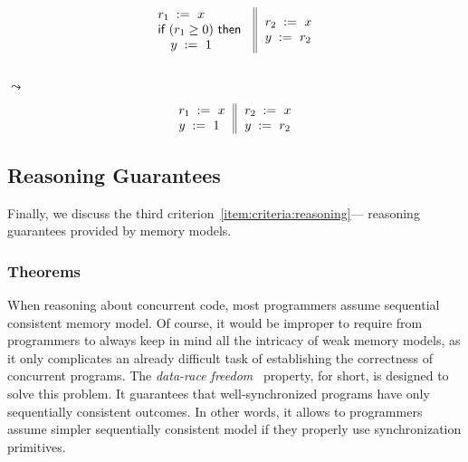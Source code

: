 {\footnotesize
\begin{minipage}{0.45\linewidth}
\begin{equation*}
\inarrII{
   \readInst{}{r_1}{x}             \\
   \kw{if} (r_1 \geq 0) ~\kw{then} \\
   \quad\writeInst{}{y}{1}         \\
}{
  \readInst{}{r_2}{x}               \\
  \writeInst{}{y}{r_2}              \\
}
\end{equation*}
\end{minipage}\hfill%
\begin{minipage}{0.05\linewidth}
\Large~\\ $\leadsto$
\end{minipage}\hfill%
\begin{minipage}{0.4\linewidth}
\begin{equation*}
\inarrII{
   \readInst{}{r_1}{x}             \\
   \writeInst{}{y}{1}              \\
}{
  \readInst{}{r_2}{x}               \\
  \writeInst{}{y}{r_2}              \\
}
\end{equation*}
\end{minipage}
}

\subsection{Reasoning Guarantees}


Finally, we discuss the third criterion~\ref{item:criteria:reasoning}---%
reasoning guarantees provided by memory models. 

\subsubsection{\DRF Theorems}
\label{sec:background:drf}

When reasoning about concurrent code, most programmers 
assume sequential consistent memory model.
Of course, it would be improper to require from 
programmers to always keep in mind 
all the intricacy of weak memory models,
as it only complicates an already difficult task
of establishing the correctness of concurrent programs. 
The \emph{data-race freedom}~\cite{Manson-al:POPL05} property, 
\DRF for short, is designed to solve this problem. 
It guarantees that well-synchronized programs 
have only sequentially consistent outcomes. 
In other words, it allows to programmers assume 
simpler sequentially consistent model 
if they properly use synchronization primitives.

